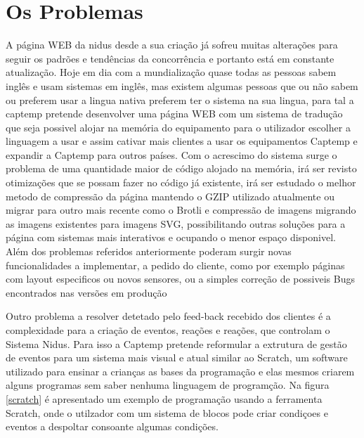 \section{Os Problemas}
A página WEB da nidus desde a sua criação já sofreu muitas alterações para seguir os padrões e tendências da concorrência e portanto está em constante atualização. Hoje em dia com a mundialização quase todas as pessoas sabem inglês e usam sistemas em inglês, mas existem algumas pessoas que ou não sabem ou preferem usar a lingua nativa preferem ter o sistema na sua lingua, para tal a captemp pretende desenvolver uma página WEB com um sistema de tradução que seja possivel alojar na memória do equipamento para o utilizador escolher a linguagem a usar e assim cativar mais clientes a usar os equipamentos Captemp e expandir a Captemp para outros países. Com o acrescimo do sistema surge o problema de uma quantidade maior de código alojado na memória, irá ser revisto otimizações que se possam fazer no código já existente, irá ser estudado o melhor metodo de compressão da página mantendo o GZIP utilizado atualmente ou migrar para outro mais recente como o Brotli e compressão de imagens migrando as imagens existentes para imagens SVG, possibilitando outras soluções para a página com sistemas mais interativos e ocupando o menor espaço disponivel. Além dos problemas referidos anteriormente poderam surgir novas funcionalidades a implementar, a pedido do cliente, como por exemplo páginas com layout especificos ou novos sensores, ou a simples correção de possiveis Bugs encontrados nas versões em produção
\par
Outro problema a resolver detetado pelo feed-back recebido dos clientes é a complexidade para a criação de eventos, reações e reações, que controlam o Sistema Nidus. Para isso a Captemp pretende reformular a extrutura de gestão de eventos para um sistema mais visual  e atual similar ao Scratch, um software utilizado para ensinar a crianças as bases da programação e elas mesmos criarem alguns programas sem saber nenhuma linguagem de programção. Na figura \ref{scratch} é apresentado um exemplo de programação usando a ferramenta Scratch, onde o utilzador com um sistema de blocos pode criar condiçoes e eventos a despoltar consoante algumas condições.
